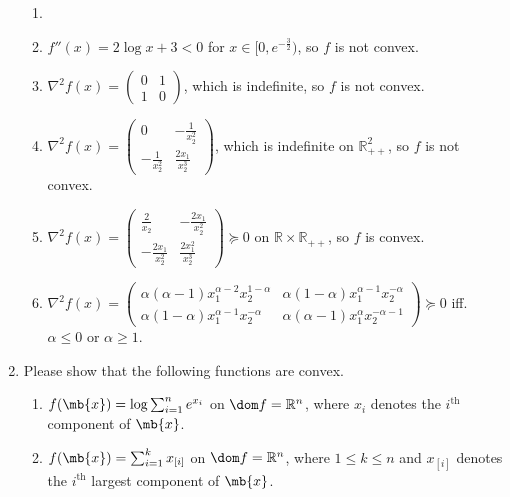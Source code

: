 \begin{exercise}
\begin{enumerate}
      \begin{solution}
        \begin{enumerate}
          \item []
          \item $f''(x) = 2\log x + 3 < 0$ for $x \in [0, e^{-\frac{3}{2}})$, so $f$ is not convex.
          \item $\nabla^2 f(x) = \begin{pmatrix} 0 & 1 \\ 1 & 0 \end{pmatrix}$, which is indefinite, so $f$ is not convex.
          \item $\nabla^2 f(x) = \begin{pmatrix} 0 & -\frac{1}{x_2^2} \\ -\frac{1}{x_2^2} & \frac{2x_1}{x_2^3} \end{pmatrix}$, which is indefinite on $\mathbb{R}^2_{++}$, so $f$ is not convex.
          \item $\nabla^2 f(x) = \begin{pmatrix} \frac{2}{x_2} & -\frac{2x_1}{x_2^2} \\ -\frac{2x_1}{x_2^2} & \frac{2x_1^2}{x_2^3} \end{pmatrix} \succeq 0 $ on $\mathbb{R}\times\mathbb{R}_{++}$, so $f$ is convex.
          \item $\nabla^2 f(x) = \begin{pmatrix} \alpha(\alpha-1)x_1^{\alpha-2}x_2^{1-\alpha} & \alpha(1-\alpha)x_1^{\alpha-1}x_2^{-\alpha} \\ \alpha(1-\alpha)x_1^{\alpha-1}x_2^{-\alpha} & \alpha(\alpha-1)x_1^{\alpha}x_2^{-\alpha-1} \end{pmatrix} \succeq 0 $ iff. $\alpha \le 0$ or $\alpha \ge 1$.
            \qedhere
        \end{enumerate}
      \end{solution}
      
    \item
      Please show that the following functions are convex.
      \begin{enumerate}
        \item
          $ f(\mb{x})=\log \sum_{i=1}^n e^{x_i}$
          on $\dom f=\mathbb{R}^n$, where $x_i$ denotes the $i^{\text{th}}$ component of $\mb{x}$.
          
        \item
          $f(\mb{x})=\sum_{i=1}^k x_{[i]}$ on $\dom f=\mathbb{R}^n$, where $1\le k\le n$ and $x_{[i]}$ denotes the $i^{\text{th}}$ largest component of $\mb{x}$.
          

\end{enumerate}
\end{enumerate}
\end{exercise}
